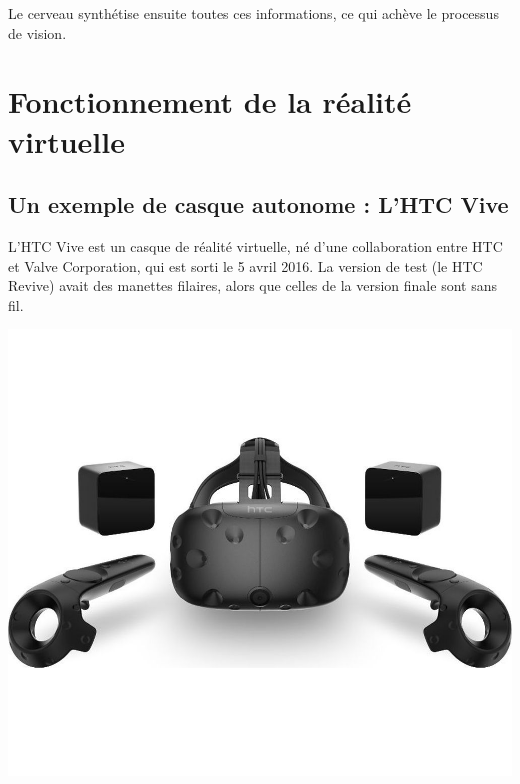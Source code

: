 \documentclass[12pt, a4paper]{report}
\begin{document}
Le cerveau synthétise ensuite toutes ces informations, ce qui achève le processus de vision.

\chapter[Fontionnement]{Fonctionnement de la réalité virtuelle}

\section{Un exemple de casque autonome : L'HTC Vive}

L'HTC Vive est un casque de réalité virtuelle, né d'une collaboration entre HTC et Valve Corporation, qui est sorti le 5 avril 2016.
La version de test (le HTC Revive) avait des manettes filaires, alors que celles de la version finale sont sans fil.

\begin{center}
\includegraphics[scale=0.2]{htc.jpg}
\end{center}
\end{document}
